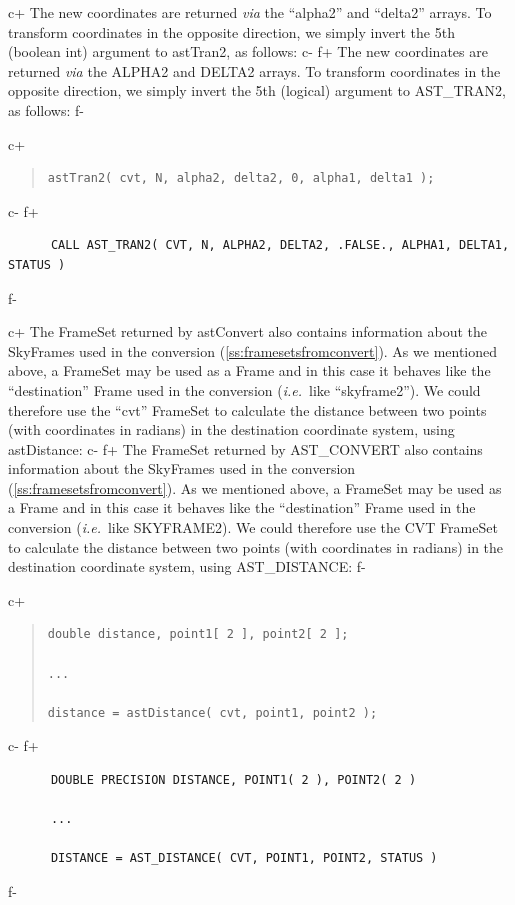 \documentclass[twoside,11pt]{article}
\newcommand{\secref}[1]{\S\ref{#1}}
\renewcommand{\secref}[1]{\ref{#1}}
\begin{document}
c+
The new coordinates are returned {\em{via}} the ``alpha2'' and
``delta2'' arrays.  To transform coordinates in the opposite
direction, we simply invert the 5th (boolean int) argument to
astTran2, as follows:
c-
f+
The new coordinates are returned {\em{via}} the ALPHA2 and DELTA2
arrays.  To transform coordinates in the opposite direction, we simply
invert the 5th (logical) argument to AST\_TRAN2, as follows:
f-

c+
\begin{quote}
\small
\begin{verbatim}
astTran2( cvt, N, alpha2, delta2, 0, alpha1, delta1 );
\end{verbatim}
\normalsize
\end{quote}
c-
f+
\small
\begin{verbatim}
      CALL AST_TRAN2( CVT, N, ALPHA2, DELTA2, .FALSE., ALPHA1, DELTA1, STATUS )
\end{verbatim}
\normalsize
f-

c+
The FrameSet returned by astConvert also contains information about
the SkyFrames used in the conversion
(\secref{ss:framesetsfromconvert}). As we mentioned above, a FrameSet
may be used as a Frame and in this case it behaves like the
``destination'' Frame used in the conversion ({\em{i.e.}}\ like
``skyframe2'').  We could therefore use the ``cvt'' FrameSet to
calculate the distance between two points (with coordinates in
radians) in the destination coordinate system, using astDistance:
c-
f+
The FrameSet returned by AST\_CONVERT also contains information about
the SkyFrames used in the conversion
(\secref{ss:framesetsfromconvert}). As we mentioned above, a FrameSet
may be used as a Frame and in this case it behaves like the
``destination'' Frame used in the conversion ({\em{i.e.}}\ like
SKYFRAME2). We could therefore use the CVT FrameSet to calculate the
distance between two points (with coordinates in radians) in the
destination coordinate system, using AST\_DISTANCE:
f-

c+
\begin{quote}
\small
\begin{verbatim}
double distance, point1[ 2 ], point2[ 2 ];

...

distance = astDistance( cvt, point1, point2 );
\end{verbatim}
\normalsize
\end{quote}
c-
f+
\small
\begin{verbatim}
      DOUBLE PRECISION DISTANCE, POINT1( 2 ), POINT2( 2 )

      ...

      DISTANCE = AST_DISTANCE( CVT, POINT1, POINT2, STATUS )
\end{verbatim}
\normalsize
f-
\end{document}

